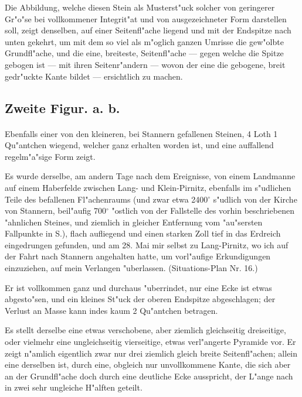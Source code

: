 \documentclass[a4paper, 11pt, oneside, german]{article}
\begin{document}
Die Abbildung, welche diesen Stein als Musterst"uck solcher von geringerer Gr"o"se bei vollkommener Integrit"at und von ausgezeichneter Form darstellen soll, zeigt denselben, auf einer Seitenfl"ache liegend und mit der Endspitze nach unten gekehrt, um mit dem so viel als m"oglich ganzen Umrisse die gew"olbte Grundfl"ache, und die eine, breiteste, Seitenfl"ache --- gegen welche die Spitze gebogen ist --- mit ihren Seitenr"andern --- wovon der eine die gebogene, breit gedr"uckte Kante bildet --- ersichtlich zu machen.

\subsection{Zweite Figur. a. b.}
\paragraph{}
Ebenfalls einer von den kleineren, bei Stannern gefallenen Steinen, 4 Loth 1 Qu"antchen wiegend, welcher ganz erhalten worden ist, und eine auffallend regelm"a"sige Form zeigt.

Es wurde derselbe, am andern Tage nach dem Ereignisse, von einem Landmanne auf einem Haberfelde zwischen Lang- und Klein-Pirnitz, ebenfalls im s"udlichen Teile des befallenen Fl"achenraums (und zwar etwa 2400$^{\circ}$ s"udlich von der Kirche von Stannern, beil"aufig 700$^{\circ}$ "ostlich von der Fallstelle des vorhin beschriebenen "ahnlichen Steines, und ziemlich in gleicher Entfernung vom "au"sersten Fallpunkte in S.), flach aufliegend und einen starken Zoll tief in das Erdreich eingedrungen gefunden, und am 28. Mai mir selbst zu Lang-Pirnitz, wo ich auf der Fahrt nach Stannern angehalten hatte, um vorl"aufige Erkundigungen einzuziehen, auf mein Verlangen "uberlassen. (Situations-Plan Nr. 16.)

Er ist vollkommen ganz und durchaus "uberrindet, nur eine Ecke ist etwas abgesto"sen, und ein kleines St"uck der oberen Endspitze abgeschlagen; der Verlust an Masse kann indes kaum 2 Qu"antchen betragen.

Es stellt derselbe eine etwas verschobene, aber ziemlich gleichseitig dreiseitige, oder vielmehr eine ungleichseitig vierseitige, etwas verl"angerte Pyramide vor. Er zeigt n"amlich eigentlich zwar nur drei ziemlich gleich breite Seitenfl"achen; allein eine derselben ist, durch eine, obgleich nur unvollkommene Kante, die sich aber an der Grundfl"ache doch durch eine deutliche Ecke ausspricht, der L"ange nach in zwei sehr ungleiche H"alften geteilt.
\end{document}
